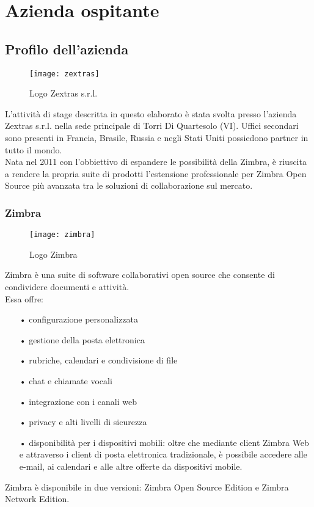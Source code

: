 \chapter{Azienda ospitante}\label{chap:company}

\section{Profilo dell'azienda}
\begin{figure}[H] 
	\centering
	\texttt{[image: zextras]}
	\caption{Logo Zextras s.r.l.}
	\label{fig:logoZextras}
\end{figure}
L'attività di stage descritta in questo elaborato è stata svolta presso l'azienda Zextras s.r.l. nella sede principale di Torri Di Quartesolo (VI). Uffici secondari sono presenti in Francia, Brasile, Russia e negli Stati Uniti possiedono partner in tutto il mondo.\\
Nata nel 2011 con l'obbiettivo di espandere le possibilità della  Zimbra, è riuscita a rendere la propria suite di prodotti l'estensione professionale per Zimbra Open Source più avanzata tra le soluzioni di collaborazione sul mercato. 

\subsection{Zimbra}
\begin{figure}[H] 
	\centering
	\texttt{[image: zimbra]}
	\caption{Logo Zimbra}
	\label{fig:logoZimbra}
\end{figure}
Zimbra è una suite di software collaborativi open source che consente di condividere documenti e attività.  \\
Essa offre:
\begin{itemize}
	\item[•] configurazione personalizzata
	\item[•] gestione della posta elettronica
	\item[•] rubriche, calendari e condivisione di file
	\item[•] chat e chiamate vocali
	\item[•] integrazione con i canali web
	\item[•] privacy e alti livelli di sicurezza
	\item[•] disponibilità per i dispositivi mobili: oltre che mediante client Zimbra Web e attraverso i client di posta elettronica tradizionale, è possibile accedere alle e-mail, ai calendari e alle altre offerte da dispositivi mobile. 
\end{itemize}
Zimbra è disponibile in due versioni: Zimbra Open Source Edition e Zimbra Network Edition. 

